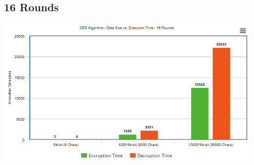 \documentclass[11pt]{article}
\begin{document}
\subsection{16 Rounds}
\includegraphics[scale=.8]{16RoundGraph}

\setcounter{secnumdepth}{1}
\end{document}

